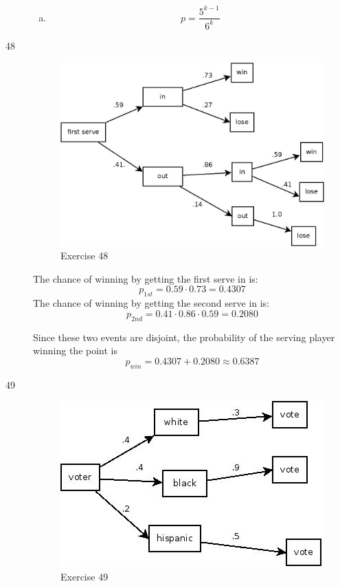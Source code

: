 \documentclass[letterpaper, landscape]{exam}
\begin{document}
\begin{description}
\begin{enumerate}[(a)]
        \item
          \[
            p = \frac{5^{k - 1}}{6^k}
          \]

      \end{enumerate}

    \item[48]
      \begin{figure}[H]
        \centering
        \includegraphics[scale = 0.2]{ex48.jpg}
        \caption{Exercise 48}
      \end{figure}

      The chance of winning by getting the first serve in is:
      \[
        p_{1st} = 0.59 \cdot 0.73 = 0.4307
      \]
      The chance of winning by getting the second serve in is:
      \[
        p_{2nd} = 0.41 \cdot 0.86 \cdot 0.59 = 0.2080
      \]

      Since these two events are disjoint, the probability of the serving player
      winning the point is
      \[
        p_{win} = 0.4307 + 0.2080 \approx \boxed{ 0.6387 }
      \]

    \item[49]
      \begin{figure}[H]
        \centering
        \includegraphics[scale = 0.4]{ex49.jpg}
        \caption{Exercise 49}
      \end{figure}


\end{description}
\end{document}
